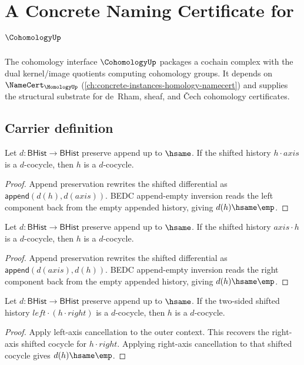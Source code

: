 \chapter{A Concrete Naming Certificate for $\CohomologyUp$}
\label{ch:concrete-instances-cohomology-namecert}

The cohomology interface $\CohomologyUp$ packages a cochain complex with the dual kernel/image quotients computing cohomology groups. It depends on $\NameCert_{\HomologyUp}$ (\autoref{ch:concrete-instances-homology-namecert}) and supplies the structural substrate for de~Rham, sheaf, and \v{C}ech cohomology certificates.

\section{Carrier definition}
\label{sec:cohomology-carrier}

\begin{theorem}
\label{thm:cohomology-cocycle-axis-right-cancel}
Let $d:\mathsf{BHist}\to\mathsf{BHist}$ preserve append up to $\hsame$. If
the shifted history $h\cdot axis$ is a $d$-cocycle, then $h$ is a
$d$-cocycle.
\end{theorem}
\begin{proof}
Append preservation rewrites the shifted differential as
$\mathsf{append}(d(h),d(axis))$. BEDC append-empty inversion reads the left
component back from the empty appended history, giving $d(h)\hsame\emp$.
\end{proof}

\begin{theorem}
\label{thm:cohomology-cocycle-axis-left-cancel}
Let $d:\mathsf{BHist}\to\mathsf{BHist}$ preserve append up to $\hsame$. If
the shifted history $axis\cdot h$ is a $d$-cocycle, then $h$ is a
$d$-cocycle.
\end{theorem}
\begin{proof}
Append preservation rewrites the shifted differential as
$\mathsf{append}(d(axis),d(h))$. BEDC append-empty inversion reads the right
component back from the empty appended history, giving $d(h)\hsame\emp$.
\end{proof}

\begin{theorem}
\label{thm:cohomology-cocycle-axis-context-cancel}
Let $d:\mathsf{BHist}\to\mathsf{BHist}$ preserve append up to $\hsame$. If
the two-sided shifted history $left\cdot(h\cdot right)$ is a $d$-cocycle,
then $h$ is a $d$-cocycle.
\end{theorem}
\begin{proof}
Apply left-axis cancellation to the outer context. This recovers the
right-axis shifted cocycle for $h\cdot right$. Applying right-axis
cancellation to that shifted cocycle gives $d(h)\hsame\emp$.
\end{proof}

